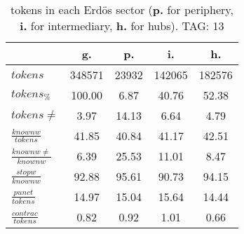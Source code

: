 \begin{table}[h!]
\begin{center}
\begin{tabular}{| l || c | c | c | c |}\hline
 & {\bf g.} & {\bf p.} & {\bf i.} & {\bf h.} \\\hline\hline
$tokens$ & 348571  & 23932  & 142065  & 182576 \\
$tokens_{\%}$ & 100.00  & 6.87  & 40.76  & 52.38 \\
$tokens \neq$ & 3.97  & 14.13  & 6.64  & 4.79 \\\hline
$\frac{knownw}{tokens}$ & 41.85  & 40.84  & 41.17  & 42.51 \\
$\frac{knownw \neq}{knownw}$ & 6.39  & 25.53  & 11.01  & 8.47 \\\hline
$\frac{stopw}{knownw}$ & 92.88  & 95.61  & 90.73  & 94.15 \\
$\frac{punct}{tokens}$ & 14.97  & 15.04  & 15.64  & 14.44 \\
$\frac{contrac}{tokens}$ & 0.82  & 0.92  & 1.01  & 0.66 \\\hline
\end{tabular}
\caption{tokens in each Erd\"os sector ({{\bf p.}} for periphery, {{\bf i.}} for intermediary, 
    {{\bf h.}} for hubs). TAG: 13}
\end{center}
\end{table}